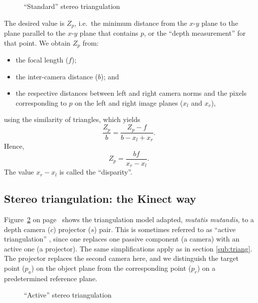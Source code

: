 \begin{figure}[ht]
    \begin{center}
        
        \caption{``Standard'' stereo triangulation}
        \label{fig:triang}
    \end{center}
\end{figure}

The desired value is $Z_{p}$, i.e.\ the minimum distance from the $x$-$y$ plane to the plane parallel to the $x$-$y$ plane that contains $p$, or the ``depth measurement'' for that point. We obtain $Z_{p}$ from: 
\begin{itemize}

    \item the focal length ($f$);

    \item the inter-camera distance ($b$); and 

    \item the respective distances between left and right camera norms and the
    pixels corresponding to $p$ on the left and right image planes ($x_{l}$ and
    $x_{r}$),

\end{itemize}
using the similarity of triangles, which yields
\[
    \frac{Z_p}{b} = \frac{Z_p - f}{b - x_l + x_r}.
\]
Hence,
\[
Z_p = \frac {bf}{x_r - x_l}.
\]
The value $x_r - x_l$ is called the ``disparity''.

\subsection{Stereo triangulation: the Kinect way}
\label{sub:atriang}

Figure~\ref{fig:atriang} on page~\pageref{fig:atriang} shows the triangulation
model adapted, \emph{mutatis mutandis}, to a depth camera ($c$) projector ($s$)
pair. This is sometimes referred to as ``active triangulation''
\cite{alexander1987}, since one replaces one passive component (a camera) with
an active one (a projector). The same simplifications apply as in section
\ref{sub:triang}. The projector replaces the second camera here, and we
distinguish the target point ($p_a$) on the object plane from the corresponding
point ($p_r$) on a predetermined reference plane.

\begin{figure}[ht]
    \begin{center}
        
        \caption{``Active'' stereo triangulation}
        \label{fig:atriang}
    \end{center}
\end{figure}

